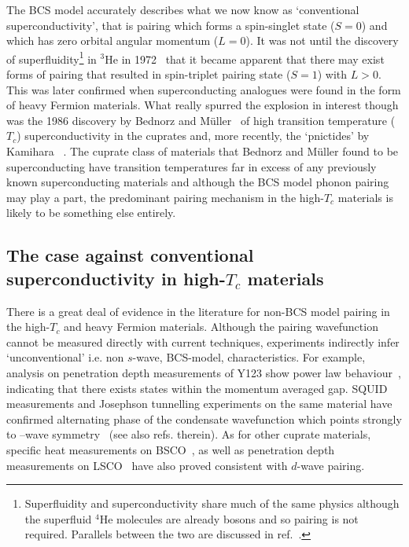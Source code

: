 The \ac{BCS} model accurately describes what we now know as `conventional superconductivity', that is pairing which forms a spin-singlet state ($S=0$) and which has zero orbital angular momentum ($L=0$). It was not until the discovery of superfluidity\footnote{Superfluidity and superconductivity share much of the same physics although the superfluid $^4$He molecules are already bosons and so pairing is not required. Parallels between the two are discussed in ref.~\cite{Annett2010}.} in $^3$He in 1972~\cite{Osheroff1972} that it became apparent that there may exist forms of pairing that resulted in spin-triplet pairing state ($S=1$) with $L>0$. This was later confirmed when superconducting analogues were found in the form of heavy Fermion materials. What really spurred the explosion in interest though was the 1986 discovery by Bednorz and M\"uller~\cite{Bednorz} of high transition temperature ($T_c$) superconductivity in the cuprates and, more recently, the `pnictides' by Kamihara \etal~\cite{Kamihara2008}. The cuprate class of materials that Bednorz and M\"uller found to be superconducting have transition temperatures far in excess of any previously known superconducting materials and although the \ac{BCS} model phonon pairing may play a part, the predominant pairing mechanism in the high-$T_c$ materials is likely to be something else entirely.

\subsection{The case against conventional superconductivity in high-$T_c$ materials}

There is a great deal of evidence in the literature for non-\ac{BCS} model pairing in the high-$T_c$ and heavy Fermion materials. Although the pairing wavefunction cannot be measured directly with current techniques, experiments indirectly infer `unconventional' i.e. non $s$-wave, \ac{BCS}-model, characteristics. For example, analysis on penetration depth measurements of \ac{Y123} show power law behaviour~\cite{Annett1991}, indicating that there exists states within the momentum averaged gap. SQUID measurements and Josephson tunnelling experiments on the same material have confirmed alternating phase of the condensate wavefunction which points strongly to \DxTwoyTwo--wave symmetry~\cite{VanHarlingen1994} (see also refs. therein). As for other cuprate materials, specific heat measurements on \ac{BSCO}~\cite{Wang2011}, as well as penetration depth measurements on LSCO~\cite{Froehlich1996} have also proved consistent with $d$-wave pairing. 

